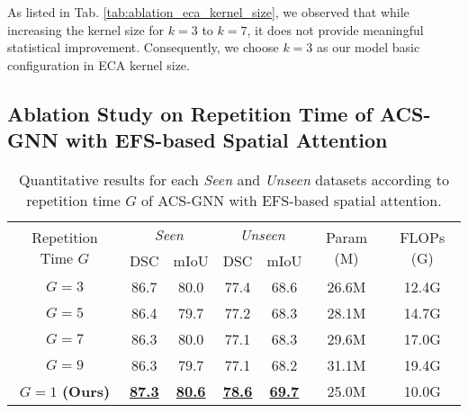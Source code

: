 As listed in Tab. \ref{tab:ablation_eca_kernel_size}, we observed that while increasing the kernel size for $k = 3$ to $k = 7$, it does not provide meaningful statistical improvement. Consequently, we choose $k = 3$ as our model basic configuration in ECA kernel size.

\subsection{Ablation Study on Repetition Time of ACS-GNN with EFS-based Spatial Attention}

\begin{table}[h]
    \centering
    \scriptsize
    \setlength\tabcolsep{2.5pt} %
    \begin{tabular}{c|cc|cc|c|c}
    \hline
    \multicolumn{1}{c|}{\multirow{2}{*}{Repetition Time $G$}} & \multicolumn{2}{c|}{\textit{Seen}}  & \multicolumn{2}{c|}{\textit{Unseen}} & \multicolumn{1}{c|}{\multirow{2}{*}{Param (M)}}  & \multicolumn{1}{c}{\multirow{2}{*}{FLOPs (G)}} \\ \cline{2-5}
     & DSC & mIoU & DSC & mIoU & & \\ 
    \hline
     $G = 3$ & 86.7 & 80.0 & 77.4 & 68.6 & 26.6M & 12.4G \\
     $G = 5$ & 86.4 & 79.7 & 77.2 & 68.3 & 28.1M & 14.7G \\
     $G = 7$ & 86.3 & 80.0 & 77.1 & 68.3 & 29.6M & 17.0G \\
     $G = 9$ & 86.3 & 79.7 & 77.1 & 68.2 & 31.1M & 19.4G \\
    \hline
    $G = 1$ \textbf{(Ours)} & \textbf{\underline{87.3}} & \textbf{\underline{80.6}} & \textbf{\underline{78.6}} & \textbf{\underline{69.7}} & 25.0M & 10.0G \\
    \hline
    \end{tabular}
    \caption{Quantitative results for each \textit{Seen} and \textit{Unseen} datasets according to repetition time $G$ of ACS-GNN with EFS-based spatial attention.}
    \label{tab:ablation_repetition_time}
\end{table}

